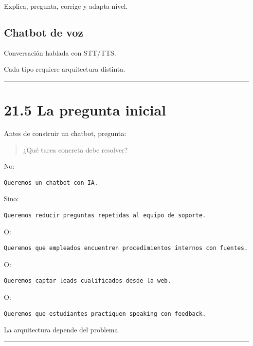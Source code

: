 Explica, pregunta, corrige y adapta nivel.

\subsection{Chatbot de voz}\label{chatbot-de-voz}

Conversación hablada con STT/TTS.

Cada tipo requiere arquitectura distinta.

\begin{center}\rule{0.5\linewidth}{0.5pt}\end{center}

\section{21.5 La pregunta inicial}\label{la-pregunta-inicial}

Antes de construir un chatbot, pregunta:

\begin{quote}
¿Qué tarea concreta debe resolver?
\end{quote}

No:

\begin{lstlisting}
Queremos un chatbot con IA.
\end{lstlisting}

Sino:

\begin{lstlisting}
Queremos reducir preguntas repetidas al equipo de soporte.
\end{lstlisting}

O:

\begin{lstlisting}
Queremos que empleados encuentren procedimientos internos con fuentes.
\end{lstlisting}

O:

\begin{lstlisting}
Queremos captar leads cualificados desde la web.
\end{lstlisting}

O:

\begin{lstlisting}
Queremos que estudiantes practiquen speaking con feedback.
\end{lstlisting}

La arquitectura depende del problema.

\begin{center}\rule{0.5\linewidth}{0.5pt}\end{center}

